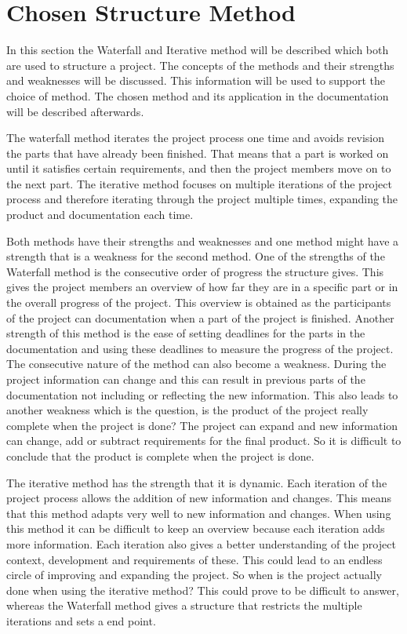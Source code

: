 \chapter{Chosen Structure Method}

In this section the Waterfall and Iterative method will be described which both are used to structure a project. The concepts of the methods and their strengths and weaknesses will be discussed. This information will be used to support the choice of method. The chosen method and its application in the documentation will be described afterwards.

The waterfall method iterates the project process one time and avoids revision the parts that have already been finished. That means that a part is worked on until it satisfies certain requirements, and then the project members move on to the next part. The iterative method focuses on multiple iterations of the project process and therefore iterating through the project multiple times, expanding the product and documentation each time.

Both methods have their strengths and weaknesses and one method might have a strength that is a weakness for the second method. One of the strengths of the Waterfall method is the consecutive order of progress the structure gives. This gives the project members an overview of how far they are in a specific part or in the overall progress of the project. This overview is obtained as the participants of the project can documentation when a part of the project is finished. Another strength of this method is the ease of setting deadlines for the parts in the documentation and using these deadlines to measure the progress of the project. The consecutive nature of the method can also become a weakness. During the project information can change and this can result in previous parts of the documentation not including or reflecting the new information. This also leads to another weakness which is the question, is the product of the project really complete when the project is done? The project can expand and new information can change, add or subtract requirements for the final product. So it is difficult to conclude that the product is complete when the project is done. 

The iterative method has the strength that it is dynamic. Each iteration of the project process allows the addition of new information and changes. This means that this method adapts very well to new information and changes. When using this method it can be difficult to keep an overview because each iteration adds more information. Each iteration also gives a better understanding of the project context, development and requirements of these. This could lead to an endless circle of improving and expanding the project. So when is the project actually done when using the iterative method? This could prove to be difficult to answer, whereas the Waterfall method gives a structure that restricts the multiple iterations and sets a end point. 

